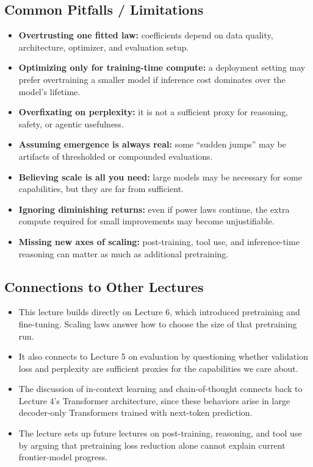 \documentclass[11pt]{article}
\begin{document}
\subsection{Common Pitfalls / Limitations}
\begin{itemize}
    \item \textbf{Overtrusting one fitted law:} coefficients depend on data quality, architecture, optimizer, and evaluation setup.
    \item \textbf{Optimizing only for training-time compute:} a deployment setting may prefer overtraining a smaller model if inference cost dominates over the model's lifetime.
    \item \textbf{Overfixating on perplexity:} it is not a sufficient proxy for reasoning, safety, or agentic usefulness.
    \item \textbf{Assuming emergence is always real:} some ``sudden jumps'' may be artifacts of thresholded or compounded evaluations.
    \item \textbf{Believing scale is all you need:} large models may be necessary for some capabilities, but they are far from sufficient.
    \item \textbf{Ignoring diminishing returns:} even if power laws continue, the extra compute required for small improvements may become unjustifiable.
    \item \textbf{Missing new axes of scaling:} post-training, tool use, and inference-time reasoning can matter as much as additional pretraining.
\end{itemize}

\subsection{Connections to Other Lectures}
\begin{itemize}
    \item This lecture builds directly on Lecture 6, which introduced pretraining and fine-tuning. Scaling laws answer how to choose the size of that pretraining run.
    \item It also connects to Lecture 5 on evaluation by questioning whether validation loss and perplexity are sufficient proxies for the capabilities we care about.
    \item The discussion of in-context learning and chain-of-thought connects back to Lecture 4's Transformer architecture, since these behaviors arise in large decoder-only Transformers trained with next-token prediction.
    \item The lecture sets up future lectures on post-training, reasoning, and tool use by arguing that pretraining loss reduction alone cannot explain current frontier-model progress.
\end{itemize}
\end{document}

